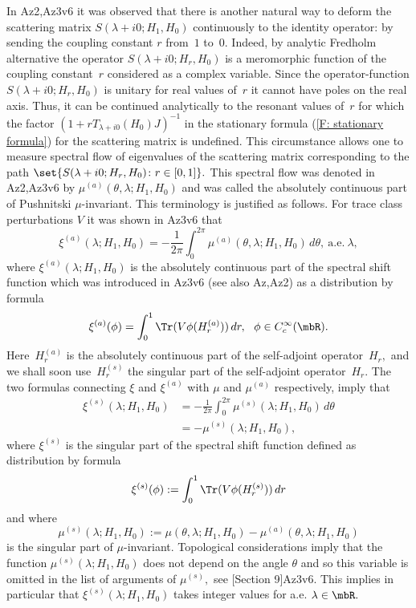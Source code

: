 \documentclass[11pt]{amsart}
\numberwithin{equation}{section}
\begin{document}
In {\futurelet\NChar\CleverCite}{Az2,Az3v6} it was observed that there is another natural way to deform the scattering matrix
$S(\lambda+i0; H_1,H_0)$ continuously to the identity operator: by sending the coupling constant $r$ from~$1$ to~$0.$
Indeed, by analytic Fredholm alternative the operator $S(\lambda+i0; H_r,H_0)$ is a meromorphic function of the coupling constant~$r$ considered as a complex variable.
Since the operator-function $S(\lambda+i0; H_r,H_0)$ is unitary for real values of~$r$ it cannot have poles on the real axis. Thus, it can be continued analytically to the resonant values of~$r$
for which the factor $(1+rT_{\lambda+i0}(H_0)J)^{-1}$ in the stationary formula (\ref{F: stationary formula}) for the scattering matrix is undefined.
This circumstance allows one to measure spectral flow of eigenvalues of the scattering matrix corresponding to the path $\set{S(\lambda+i0; H_r,H_0) \colon r \in [0,1]}.$
This spectral flow was denoted in {\futurelet\NChar\CleverCite}{Az2,Az3v6} by ${\mu^{(a)}}(\theta, \lambda; H_1,H_0)$ and was called the absolutely continuous part of Pushnitski $\mu$-invariant.
This terminology is justified as follows.
For trace class perturbations $V$ it was shown in {\futurelet\NChar\CleverCite}{Az3v6} that
$$
  {\xi^{(a)}}(\lambda; H_1,H_0) = - \frac {1}{2\pi} \int_0^{2\pi} {\mu^{(a)}}(\theta, \lambda; H_1,H_0)\,d\theta, \ \text{a.e.} \ \lambda,
$$
where ${\xi^{(a)}}(\lambda; H_1,H_0)$ is the absolutely continuous part of the spectral shift function which was introduced in {\futurelet\NChar\CleverCite}{Az3v6}
(see also {\futurelet\NChar\CleverCite}{Az,Az2}) as a distribution by formula
$$
  {\xi^{(a)}}(\phi) = \int_0^1 \Tr(V\phi(H^{(a)}_r))\,dr, \ \ \phi \in C^\infty_c(\mbR).
$$
Here~$H_r^{(a)}$ is the absolutely continuous part of the
self-adjoint operator~$H_r,$ and we shall soon use~$H_r^{(s)}$ the
singular part of the self-adjoint operator~$H_r.$ The two formulas
connecting $\xi$ and ${\xi^{(a)}}$ with $\mu$ and ${\mu^{(a)}}$ respectively,
imply that
\begin{equation*}
  \begin{split}
    {\xi^{(s)}}(\lambda; H_1,H_0) & = - \frac {1}{2\pi} \int_0^{2\pi} {\mu^{(s)}}(\lambda; H_1,H_0)\,d\theta
    \\ & = - {\mu^{(s)}}(\lambda; H_1,H_0),
  \end{split}
\end{equation*}
where ${\xi^{(s)}}$ is the singular part of the spectral shift function defined as distribution by formula
$$
  {\xi^{(s)}}(\phi) := \int_0^1 \Tr(V\phi(H^{(s)}_r))\,dr
$$
and where
$$
  {\mu^{(s)}}(\lambda; H_1,H_0) := \mu(\theta, \lambda; H_1,H_0) - {\mu^{(a)}}(\theta, \lambda; H_1,H_0)
$$
is the singular part of $\mu$-invariant. Topological considerations imply that the function ${\mu^{(s)}}(\lambda; H_1,H_0)$
does not depend on the angle $\theta$ and so this variable is omitted in the list of arguments of ${\mu^{(s)}},$ see {\futurelet\NChar\CleverCite}[Section 9]{Az3v6}.
This implies in particular that ${\xi^{(s)}}(\lambda;H_1,H_0)$ takes integer values for a.e. $\lambda \in \mbR.$
\end{document}
